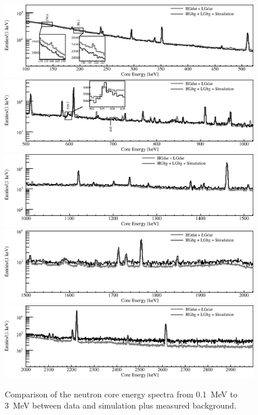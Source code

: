 \documentclass{elsart}
\begin{document}
\begin{figure}[tbhp]
  \centering
  \includegraphics[width=\textwidth,clip]{spectra_0_520keVm.eps}
  \includegraphics[width=\textwidth,clip]{spectra_500_1020keVm.eps}
  \includegraphics[width=\textwidth,clip]{spectra_1000_1520keVm.eps}
  \includegraphics[width=\textwidth,clip]{spectra_1500_2020keVm.eps}
  \includegraphics[width=\textwidth,clip]{spectra_2_3MeVm.eps}
  \caption{Comparison of the neutron core energy spectra from 0.1~MeV
    to 3~MeV between data and simulation plus measured background.}
  \label{fig:mc}
\end{figure}
\end{document}
